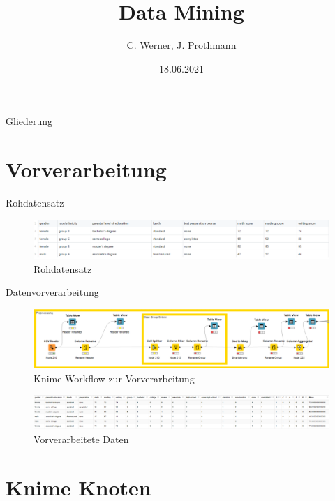 \documentclass[
	handout,
  	aspectratio=169
]{beamer}
\title[Semesterprojekt KNIME]{Data Mining}
\date{18.06.2021}
\author[C. Werner, J. Prothmann]{C. Werner, J. Prothmann}
\institute{Bereich Elektrotechnik und Informatik}
\begin{document}
	\begin{frame}[plain]
		\titlepage
	\end{frame}

	\begin{frame}{Gliederung}
		\tableofcontents
	\end{frame}
		
\section{Vorverarbeitung}
\frame{\sectionpage}
\begin{frame}{Rohdatensatz}
\begin{figure}[!h]

	\includegraphics[scale= 0.55]{../pictures/roh.png}
	\caption{Rohdatensatz}
\end{figure}
\end{frame}
\begin{frame}{Datenvorverarbeitung}
\begin{figure}[!h]

	\includegraphics[scale= 0.45]{../pictures/preprocessing.png}
	\caption{Knime Workflow zur Vorverarbeitung}
\end{figure}
\end{frame}

\begin{frame}
\begin{figure}[!h]

	\includegraphics[scale= 0.4]{../pictures/processed.png}
	\caption{Vorverarbeitete Daten}
\end{figure}
\end{frame}

\section{Knime Knoten}
\frame{\sectionpage}
\end{document}
